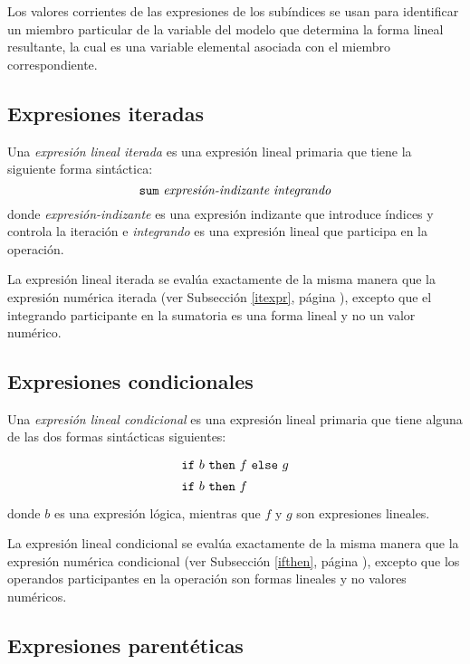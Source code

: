 \documentclass[11pt,spanish]{report}
\begin{document}
Los valores corrientes de las expresiones de los subíndices se usan para identificar un miembro particular de la variable del modelo que determina la forma lineal resultante, la cual es una variable elemental asociada con el miembro correspondiente.

\vspace*{-5pt}

\subsection{Expresiones iteradas}

Una {\it expresión lineal iterada} es una expresión lineal primaria que tiene la siguiente forma sintáctica:
$$\mbox{{\tt sum} {\it expresión-indizante} {\it integrando}}$$
donde {\it expresión-indizante} es una expresión indizante que introduce índices y controla la iteración e {\it integrando} es una expresión lineal que participa en la operación.

La expresión lineal iterada se evalúa exactamente de la misma manera que la expresión numérica iterada (ver Subsección \ref{itexpr}, página
\pageref{itexpr}), excepto que el integrando participante en la sumatoria es una forma lineal y no un valor numérico.

\vspace*{-5pt}

\subsection{Expresiones condicionales}

Una {\it expresión lineal condicional} es una expresión lineal primaria que tiene alguna de las dos formas sintácticas siguientes:
$$
{\def\arraystretch{1.4}
\begin{array}{l}
\mbox{{\tt if} $b$ {\tt then} $f$ {\tt else} $g$}\\
\mbox{{\tt if} $b$ {\tt then} $f$}\\
\end{array}
}
$$
donde $b$ es una expresión lógica, mientras que $f$ y $g$ son expresiones lineales.

La expresión lineal condicional se evalúa exactamente de la misma manera que la expresión numérica condicional (ver Subsección \ref{ifthen}, página \pageref{ifthen}), excepto que los operandos participantes en la operación son formas lineales y no valores numéricos.

\subsection{Expresiones parentéticas}
\end{document}
